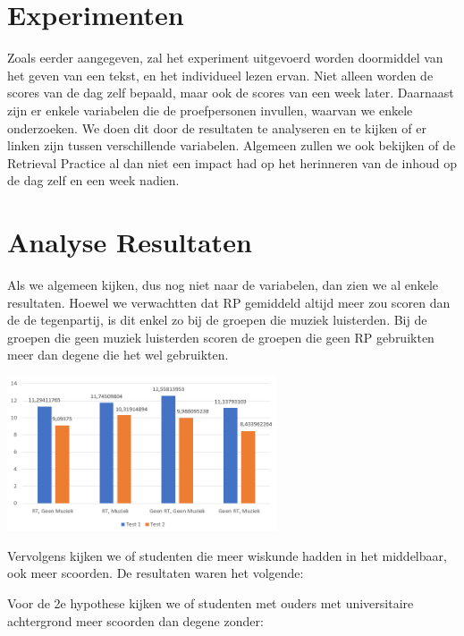 \documentclass{voorstel}
\begin{document}
	\section{Experimenten}
	\label{sec:Experimenten}
	
   Zoals eerder aangegeven, zal het experiment uitgevoerd worden doormiddel van het geven van een tekst, en het individueel lezen ervan. Niet alleen worden de scores van de dag zelf bepaald, maar ook de scores van een week later. Daarnaast zijn er enkele variabelen die de proefpersonen invullen, waarvan we enkele onderzoeken. We doen dit door de resultaten te analyseren en te kijken of er linken zijn tussen verschillende variabelen. Algemeen zullen we ook bekijken of de Retrieval Practice al dan niet een impact had op het herinneren van de inhoud op de dag zelf en een week nadien.
	
    
    \section{Analyse Resultaten}
    \label{sec:analyse_resultaten}
    
    Als we algemeen kijken, dus nog niet naar de variabelen, dan zien we al enkele resultaten. Hoewel we verwachtten dat RP gemiddeld altijd meer zou scoren dan de de tegenpartij, is dit enkel zo bij de groepen die muziek luisterden. Bij de groepen die geen muziek luisterden scoren de groepen die geen RP gebruikten meer dan degene die het wel gebruikten.

	\includegraphics[width=8cm]{img/algemeen.png}
    
    Vervolgens kijken we of studenten die meer wiskunde hadden in het middelbaar, ook meer scoorden. De resultaten waren het volgende:
    
    Voor de 2e hypothese kijken we of studenten met ouders met universitaire achtergrond meer scoorden dan degene zonder:
    
\end{document}
